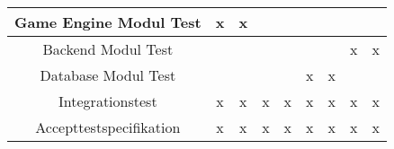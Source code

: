 \begin{center}
\begin{longtable}{|c|c|c|c|c|c|c|c|c|}
    Game Engine Modul Test      & x      & x     &       &        &        &       &       &        \\ \hline
    Backend Modul Test          &        &       &       &        &        &       & x     & x      \\ \hline
    Database Modul Test         &        &       &       &        & x      & x     &       &        \\ \hline
    Integrationstest            & x      & x     & x     & x      & x      & x     & x     & x      \\ \hline
    Accepttestspecifikation     & x      & x     & x     & x      & x      & x     & x     & x      \\ \hline
  \end{longtable}
  \addtocounter{table}{-1}
\end{center}

\newpage
